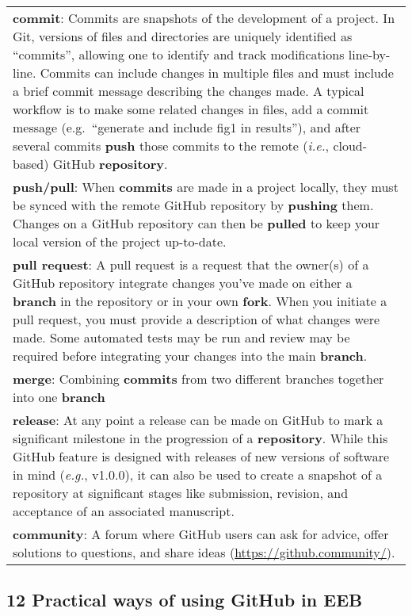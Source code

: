 \begin{tablenos:no-prefix-table-caption}
\begin{longtable}[]{@{}
  >{\raggedright\arraybackslash}p{}@{}}
\textbf{commit}: Commits are snapshots of the development of a project. In Git, versions of files and directories are uniquely identified as ``commits'', allowing one to identify and track modifications line-by-line. Commits can include changes in multiple files and must include a brief commit message describing the changes made. A typical workflow is to make some related changes in files, add a commit message (e.g.~``generate and include fig1 in results''), and after several commits \textbf{push} those commits to the remote (\emph{i.e.}, cloud-based) GitHub \textbf{repository}. \\
\textbf{push/pull}: When \textbf{commits} are made in a project locally, they must be synced with the remote GitHub repository by \textbf{pushing} them. Changes on a GitHub repository can then be \textbf{pulled} to keep your local version of the project up-to-date. \\
\textbf{pull request}: A pull request is a request that the owner(s) of a GitHub repository integrate changes you've made on either a \textbf{branch} in the repository or in your own \textbf{fork}. When you initiate a pull request, you must provide a description of what changes were made. Some automated tests may be run and review may be required before integrating your changes into the main \textbf{branch}. \\
\textbf{merge}: Combining \textbf{commits} from two different branches together into one \textbf{branch} \\
\textbf{release}: At any point a release can be made on GitHub to mark a significant milestone in the progression of a \textbf{repository}. While this GitHub feature is designed with releases of new versions of software in mind (\emph{e.g.}, v1.0.0), it can also be used to create a snapshot of a repository at significant stages like submission, revision, and acceptance of an associated manuscript. \\
\textbf{community}: A forum where GitHub users can ask for advice, offer solutions to questions, and share ideas (\url{https://github.community/}). \\
\bottomrule
\end{longtable}

\end{tablenos:no-prefix-table-caption}

\hypertarget{practical-ways-of-using-github-in-eeb}{%
\subsection{12 Practical ways of using GitHub in EEB}\label{practical-ways-of-using-github-in-eeb}}

